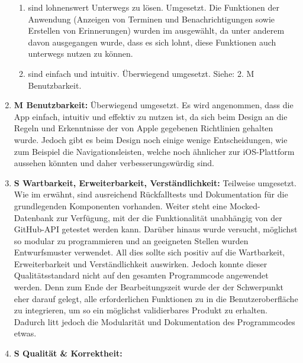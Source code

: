 \begin{enumerate}
\begin{enumerate}[label*={\arabic*}]
			\item sind lohnenswert Unterwegs zu lösen.\newline%
				Umgesetzt. Die Funktionen der Anwendung (Anzeigen von Terminen und Benachrichtigungen sowie Erstellen von Erinnerungen) wurden im  ausgewählt, da unter anderem davon ausgegangen wurde, dass es sich lohnt, diese Funktionen auch unterwegs nutzen zu können.
			\item sind einfach und intuitiv.\newline%
				Überwiegend umgesetzt. Siehe: 2. M Benutzbarkeit. 
		\end{enumerate}
	
	\item \textbf{M Benutzbarkeit:}\newline%
		Überwiegend umgesetzt. Es wird angenommen, dass die App einfach, intuitiv und effektiv zu nutzen ist, da sich beim Design an die Regeln und Erkenntnisse der von Apple gegebenen Richtlinien gehalten wurde.%
		\newline%
		Jedoch gibt es beim Design noch einige wenige Entscheidungen, wie zum Beispiel die Navigationsleisten, welche noch ähnlicher zur iOS-Plattform aussehen könnten und daher verbesserungswürdig sind.%
	\item \textbf{S Wartbarkeit, Erweiterbarkeit, Verständlichkeit:}\newline%
		Teilweise umgesetzt. Wie im  erwähnt, sind ausreichend Rückfalltests und Dokumentation für die grundlegenden Komponenten vorhanden. Weiter steht eine Mocked-Datenbank zur Verfügung, mit der die Funktionalität unabhängig von der GitHub-API getestet werden kann. Darüber hinaus wurde versucht, möglichst so modular zu programmieren und an geeigneten Stellen wurden Entwurfsmuster verwendet. All dies sollte sich positiv auf die Wartbarkeit, Erweiterbarkeit und Verständlichkeit auswirken.%
		Jedoch konnte dieser Qualitätsstandard nicht auf den gesamten Programmcode angewendet werden. Denn zum Ende der Bearbeitungszeit wurde der der Schwerpunkt eher darauf gelegt, alle erforderlichen Funktionen zu in die Benutzeroberfläche zu integrieren, um so ein möglichst validierbares Produkt zu erhalten. Dadurch litt jedoch die Modularität und Dokumentation des Programmcodes etwas.%
	\item \textbf{S Qualität \& Korrektheit:}\newline%

\end{enumerate}
